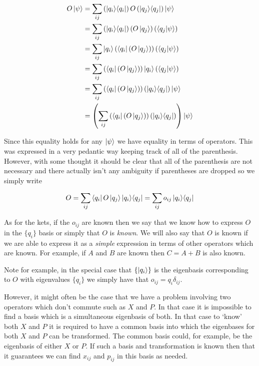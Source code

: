 \documentclass[12pt]{article}
\newcommand{\ketbra}[2]{\Ket{#1}\!\Bra{#2}}
\begin{document}
\begin{align}
O\ket{\psi} &= \sum_{ij} \left(\ketbra{q_i}{q_i} \right)O\left(\ketbra{q_j}{q_j}\right)\ket{\psi}\\
&= \sum_{ij} \left(\ketbra{q_i}{q_i}\right) \left(O \ket{q_j}\right) \left(\braket{q_j|\psi}\right)\\
&= \sum_{ij} \ket{q_i} \left(\bra{q_i}\left(O \ket{q_j} \right) \right)\left(\braket{q_j|\psi} \right)\\
&= \sum_{ij} \left(\bra{q_i}\left(O \ket{q_j} \right) \right) \ket{q_i} \left(\braket{q_j|\psi}\right)\\
&= \sum_{ij} \left(\bra{q_i}\left(O \ket{q_j} \right) \right) \left(\ketbra{q_i}{q_j}\right) \ket{\psi}\\
&= 
\left(\sum_{ij} \left(\bra{q_i}\left(O \ket{q_j} \right) \right) \left(\ketbra{q_i}{q_j}\right)\right) \ket{\psi}
\end{align}

Since this equality holds for any $\ket{\psi}$ we have equality in terms of operators. This was expressed in a very pedantic way keeping track of all of the parenthesis. However, with some thought it should be clear that all of the parenthesis are not necessary and there actually isn't any ambiguity if parentheses are dropped so we simply write

\begin{align}
O = \sum_{ij} \bra{q_i}O\ket{q_j} \ketbra{q_i}{q_j} = \sum_{ij} o_{ij} \ketbra{q_i}{q_j}
\end{align}

As for the kets, if the $o_{ij}$ are known then we say that we know how to express $O$ in the $\{q_i\}$ basis or simply that $O$ is \textit{known}. We will also say that $O$ is known if we are able to express it as a \textit{simple} expression in terms of other operators which are known. For example, if $A$ and $B$ are known then $C=A+B$ is also known.

Note for example, in the special case that $\{\ket{q_i}\}$ is the eigenbasis corresponding to $O$ with eigenvalues $\{q_i\}$ we simply have that $o_{ij} = q_i\delta_{ij}$.

However, it might often be the case that we have a problem involving two operators which don't commute such as $X$ and $P$. In that case it is impossible to find a basis which is a simultaneous eigenbasis of both. In that case to `know' both $X$ and $P$ it is required to have a common basis into which the eigenbases for both $X$ and $P$ can be transformed. The common basis could, for example, be the eigenbasis of either $X$ or $P$. If such a basis and transformation is known then that it guarantees we can find $x_{ij}$ and $p_{ij}$ in this basis as needed.
\end{document}
